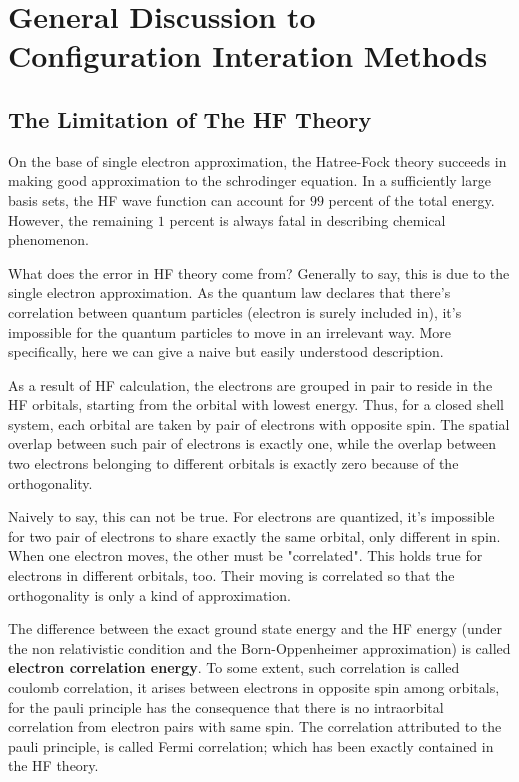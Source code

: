 \chapter{General Discussion to Configuration Interation Methods}
%
%
%
%
\section{The Limitation of The HF Theory}
%
%
On the base of single electron approximation, the Hatree-Fock theory
succeeds in making good approximation to the schrodinger equation.  In
a sufficiently large basis sets, the HF wave function can account for
$99$ percent of the total energy. However, the remaining $1$ percent
is always fatal in describing chemical phenomenon.

What does the error in HF theory come from? Generally to say, this is
due to the single electron approximation. As the quantum law declares
that there's correlation between quantum particles (electron is surely
included in), it's impossible for the quantum particles to move in an
irrelevant way. More specifically, here we can give a naive but easily
understood description.

As a result of HF calculation, the electrons are grouped in pair to
reside in the HF orbitals, starting from the orbital with lowest
energy. Thus, for a closed shell system, each orbital are taken by
pair of electrons with opposite spin. The spatial overlap between such
pair of electrons is exactly one, while the overlap between two
electrons belonging to different orbitals is exactly zero because of
the orthogonality.

Naively to say, this can not be true. For electrons are quantized,
it's impossible for two pair of electrons to share exactly the same
orbital, only different in spin. When one electron moves, the other
must be "correlated". This holds true for electrons in different
orbitals, too. Their moving is correlated so that the orthogonality is
only a kind of approximation.

The difference between the exact ground state energy and the HF energy
(under the non relativistic condition and the Born-Oppenheimer
approximation) is called \textbf{electron correlation energy}. To some
extent, such correlation is called coulomb correlation, it arises
between electrons in opposite spin among orbitals, for the pauli
principle has the consequence that there is no intraorbital
correlation from electron pairs with same spin. The correlation
attributed to the pauli principle, is called Fermi correlation; which
has been exactly contained in the HF theory.

